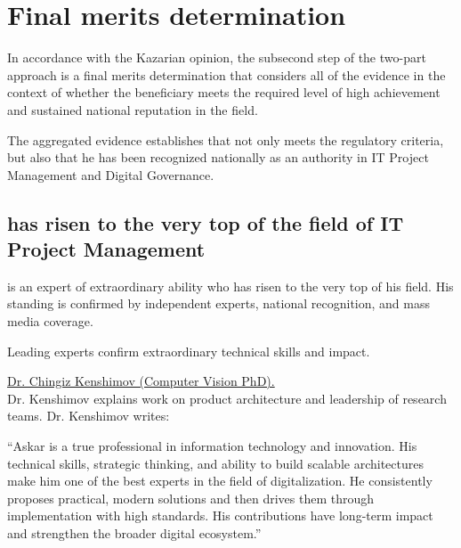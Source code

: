 \section{Final merits determination}

\label{sec:Merits}

In accordance with the Kazarian opinion, the subsecond step of the two-part approach is a final merits determination that considers all of the evidence in the context of whether the beneficiary meets the required level of high achievement and sustained national reputation in the field.

The aggregated evidence establishes that \mrl{} not only meets the regulatory criteria, but also that he has been recognized nationally as an authority in IT Project Management and Digital Governance.

\subsection{\mrl{} has risen to the very top of the field of IT Project Management}

\label{subsec:RisenToTop}

\mrl{} is an expert of extraordinary ability who has risen to the very top of his field. His standing is confirmed by independent experts, national recognition, and mass media coverage.

Leading experts confirm \mrls extraordinary technical skills and impact.

\bigskip

\noindent\underline{Dr. Chingiz Kenshimov (Computer Vision PhD).} \\
Dr. Kenshimov explains \mrls work on product architecture and leadership of research teams. Dr. Kenshimov writes:
\begin{fullquote}
``Askar is a true professional in information technology and innovation. His technical skills, strategic thinking, and ability to build scalable architectures make him one of the best experts in the field of digitalization. He consistently proposes practical, modern solutions and then drives them through implementation with high standards. His contributions have long-term impact and strengthen the broader digital ecosystem.''  
\end{fullquote}

